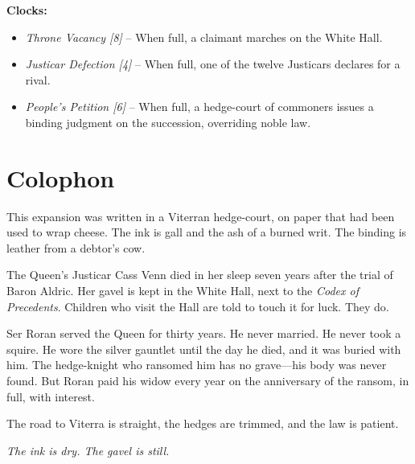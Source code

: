 \documentclass[11pt,twoside]{book}
\begin{document}
\textbf{Clocks:}
\begin{itemize}
    \item \textit{Throne Vacancy [8]} -- When full, a claimant marches on the White Hall.
    \item \textit{Justicar Defection [4]} -- When full, one of the twelve Justicars declares for a rival.
    \item \textit{People's Petition [6]} -- When full, a hedge-court of commoners issues a binding judgment on the succession, overriding noble law.
\end{itemize}

\chapter{Colophon}

This expansion was written in a Viterran hedge-court, on paper that had been used to wrap cheese. The ink is gall and the ash of a burned writ. The binding is leather from a debtor's cow.

The Queen's Justicar Cass Venn died in her sleep seven years after the trial of Baron Aldric. Her gavel is kept in the White Hall, next to the \textit{Codex of Precedents}. Children who visit the Hall are told to touch it for luck. They do.

Ser Roran served the Queen for thirty years. He never married. He never took a squire. He wore the silver gauntlet until the day he died, and it was buried with him. The hedge-knight who ransomed him has no grave---his body was never found. But Roran paid his widow every year on the anniversary of the ransom, in full, with interest.

The road to Viterra is straight, the hedges are trimmed, and the law is patient.

\begin{center}
\vspace{2em}
\textit{The ink is dry. The gavel is still.}
\end{center}
\end{document}
